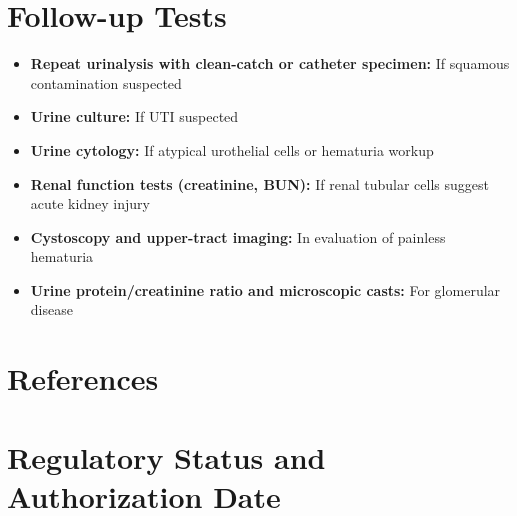 \section*{Follow-up Tests}
\begin{itemize}
  \item \textbf{Repeat urinalysis with clean-catch or catheter specimen:} If squamous contamination suspected
  \item \textbf{Urine culture:} If UTI suspected
  \item \textbf{Urine cytology:} If atypical urothelial cells or hematuria workup
  \item \textbf{Renal function tests (creatinine, BUN):} If renal tubular cells suggest acute kidney injury
  \item \textbf{Cystoscopy and upper-tract imaging:} In evaluation of painless hematuria \cite{aua2020microscopic}
  \item \textbf{Urine protein/creatinine ratio and microscopic casts:} For glomerular disease
\end{itemize}

\section*{References}



\clearpage
\section*{Regulatory Status and Authorization Date}

\clearpage
